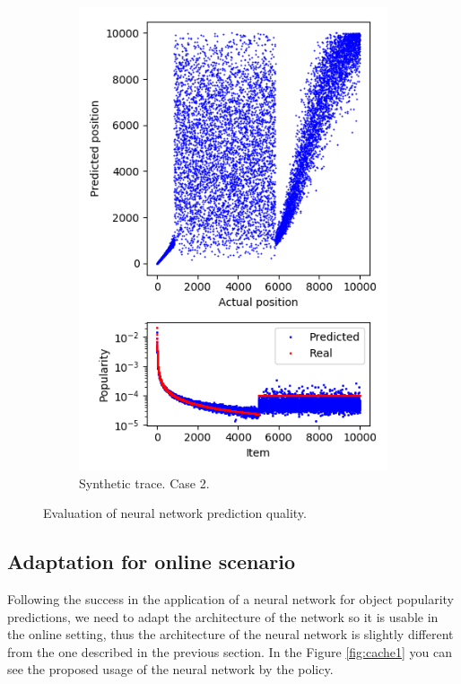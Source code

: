 \begin{figure}[t!]
\begin{subfigure}[b]{0.49\linewidth}
		\includegraphics[width=\linewidth]{pics/case2_op.png}
		\caption{Synthetic trace. Case 2.}
	\end{subfigure}
	\caption{Evaluation of neural network prediction quality.}
	\label{fig:nn2}
\end{figure}

\subsection{Adaptation for online scenario} \label{nn_online}

Following the success in the application of a neural network for object popularity predictions, we need to adapt the architecture of the network so it is usable in the online setting, thus the architecture of the neural network is slightly different from the one described in the previous section. In the Figure \ref{fig:cache1} you can see the proposed usage of the neural network by the policy.

